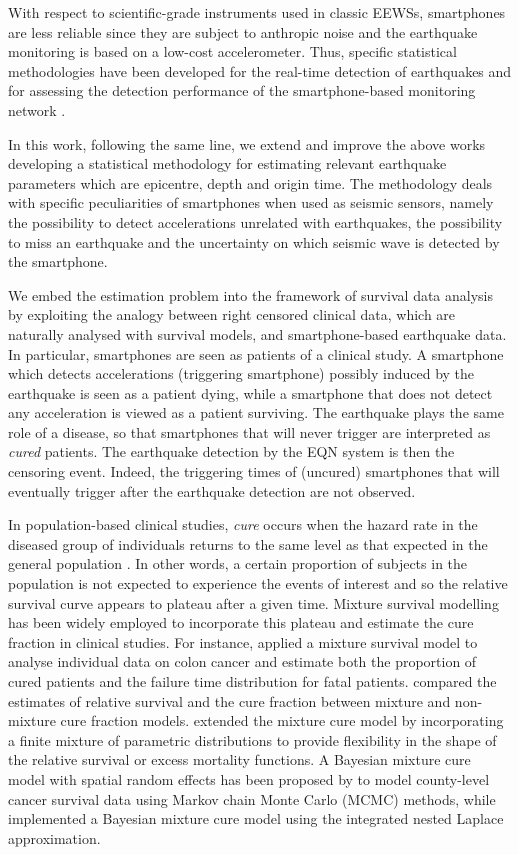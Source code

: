 \documentclass[final]{statsoc}
\begin{document}
With respect to scientific-grade instruments used in classic EEWSs, smartphones are less reliable since they are subject to anthropic noise and the earthquake monitoring is based on a low-cost accelerometer. Thus, specific statistical methodologies have been developed for the real-time detection of earthquakes \citep{finazzi2017statistical,massoda2023} and for assessing the detection performance of the smartphone-based monitoring network \citep{finazzi2022probabilistic}. 

In this work, following the same line, we extend and improve the above works developing a statistical methodology for estimating relevant earthquake parameters which are epicentre, depth and origin time. The methodology deals with specific peculiarities of smartphones when used as seismic sensors, namely the possibility to detect accelerations unrelated with earthquakes, the possibility to miss an earthquake and the uncertainty on which seismic wave is detected by the smartphone.

We embed the estimation problem into the framework of survival data analysis by exploiting the analogy between right censored clinical data, which are naturally analysed with survival models, and smartphone-based earthquake data. In particular, smartphones are seen as patients of a clinical study. A smartphone which detects accelerations (triggering smartphone) possibly induced by the earthquake is seen as a patient dying, while a smartphone that does not detect any acceleration is viewed as a patient surviving. The earthquake plays the same role of  a disease, so that smartphones that will never trigger are interpreted as \emph{cured} patients. The earthquake detection by the EQN system is then the censoring event. Indeed, the triggering times of (uncured) smartphones that will eventually trigger after the earthquake detection are not observed.

In population-based clinical studies, \emph{cure} occurs when the hazard rate in the diseased group of individuals returns to the same level as that expected in the general population \citep{peng2014cure}. In other words, a certain proportion of subjects in the population is not expected to experience the events of interest and so the relative survival curve appears to plateau after a given time. Mixture survival modelling has been widely employed to incorporate this plateau and estimate the cure fraction in clinical studies. For instance, \citet{deangelis1999} applied a  mixture  survival model to analyse individual data on colon cancer and estimate both the proportion of cured patients and the failure time distribution for fatal patients. \citet{lambert2007} compared the estimates of relative survival and the cure fraction between mixture and non-mixture cure fraction models. \citet{lambert2010estimating} extended the mixture cure model by incorporating a finite mixture of parametric distributions to provide flexibility in the shape of the relative survival or excess mortality functions. A Bayesian mixture cure model with spatial random effects has been proposed by \citet{yu2012} to model county-level cancer survival data using Markov chain Monte Carlo (MCMC)  methods, while \citet{lazaro2020} implemented  a Bayesian  mixture cure model using the integrated nested Laplace approximation.
\end{document}
